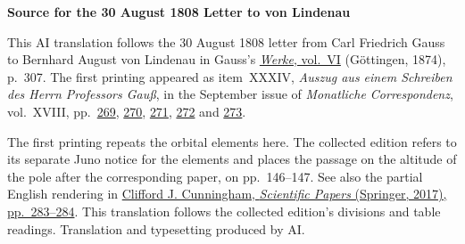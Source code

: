 \clearpage\thispagestyle{empty}
\begin{center}\textbf{Source for the 30 August 1808 Letter to von Lindenau}\end{center}
\noindent This AI translation follows the 30 August 1808 letter from Carl Friedrich Gauss to Bernhard August von Lindenau in Gauss’s \href{https://gdz.sub.uni-goettingen.de/id/PPN236007467}{\textit{Werke}, vol.~VI} (Göttingen, 1874), p.~307. The first printing appeared as item~XXXIV, \textit{Auszug aus einem Schreiben des Herrn Professors Gauß}, in the September issue of \textit{Monatliche Correspondenz}, vol.~XVIII, pp.~\href{https://www.digitale-sammlungen.de/en/view/bsb10538609?page=291}{269}, \href{https://www.digitale-sammlungen.de/en/view/bsb10538609?page=292}{270}, \href{https://www.digitale-sammlungen.de/en/view/bsb10538609?page=293}{271}, \href{https://www.digitale-sammlungen.de/en/view/bsb10538609?page=294}{272} and \href{https://www.digitale-sammlungen.de/en/view/bsb10538609?page=295}{273}.
\par\medskip
The first printing repeats the orbital elements here. The collected edition refers to its separate Juno notice for the elements and places the passage on the altitude of the pole after the corresponding paper, on pp.~146--147. See also the partial English rendering in \href{https://doi.org/10.1007/978-3-319-58118-7_12}{Clifford J. Cunningham, \textit{Scientific Papers} (Springer, 2017), pp.~283--284}. This translation follows the collected edition’s divisions and table readings. Translation and typesetting produced by AI.
\clearpage
